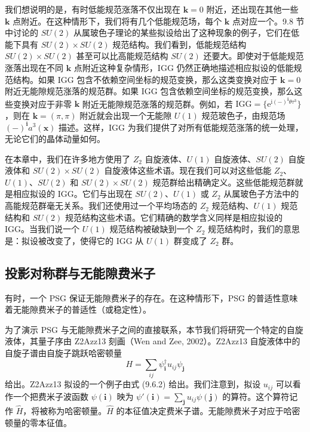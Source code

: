 我们想说明的是，有时低能规范涨落不仅出现在 $\pmb{k}=0$ 附近，还出现在其他一些 $\pmb{k}$ 点附近。在这种情形下，我们将有几个低能规范场，每个 $\pmb{k}$ 点对应一个。9.8 节中讨论的 $SU(2)$ 从属玻色子理论的某些拟设给出了这种现象的例子，它们在低能下具有 $SU(2)\times SU(2)$ 规范结构。我们看到，低能规范结构 $SU(2)\times SU(2)$ 甚至可以比高能规范结构 $SU(2)$ 还要大。即使对于低能规范涨落出现在不同 $\pmb{k}$ 点附近这种复杂情形，IGG 仍然正确地描述相应拟设的低能规范结构。如果 IGG 包含不依赖空间坐标的规范变换，那么这类变换对应于 $\pmb{k}=0$ 附近无能隙规范涨落的规范群。如果 IGG 包含依赖空间坐标的规范变换，那么这些变换对应于非零 $\pmb{k}$ 附近无能隙规范涨落的规范群。例如，若 $\mathrm{IGG}=\{\mathrm{e}^{\mathrm{i}(-)^{\pmb{i}}\theta\tau^{3}}\}$，则在 $\pmb{k}=(\pi,\pi)$ 附近就会出现一个无能隙 $U(1)$ 规范玻色子，由规范场 $(-)^{\pmb{i}}a^{3}(\pmb{x})$ 描述。这样，IGG 为我们提供了对所有低能规范涨落的统一处理，无论它们的晶体动量如何。

在本章中，我们在许多地方使用了 $Z_2$ 自旋液体、$U(1)$ 自旋液体、$SU(2)$ 自旋液体和 $SU(2)\times SU(2)$ 自旋液体这些术语。现在我们可以对这些低能 $Z_2$、$U(1)$、$SU(2)$ 和 $SU(2)\times SU(2)$ 规范群给出精确定义。这些低能规范群就是相应拟设的 IGG。它们与出现在 $SU(2)$、$U(1)$ 或 $Z_2$ 从属玻色子方法中的高能规范群毫无关系。我们还使用过一个平均场态的 $Z_2$ 规范结构、$U(1)$ 规范结构和 $SU(2)$ 规范结构这些术语。它们精确的数学含义同样是相应拟设的 IGG。当我们说一个 $U(1)$ 规范结构被破缺到一个 $Z_2$ 规范结构时，我们的意思是：拟设被改变了，使得它的 IGG 从 $U(1)$ 群变成了 $Z_2$ 群。

\subsection{投影对称群与无能隙费米子}

\begin{keypoints}
\item 有时，一个 PSG 保证无能隙费米子的存在。在这种情形下，PSG 的普适性意味着无能隙费米子的普适性（或稳定性）。
\end{keypoints}

为了演示 PSG 与无能隙费米子之间的直接联系，本节我们将研究一个特定的自旋液体，其量子序由 Z2Azz13 刻画（Wen and Zee, 2002）。Z2Azz13 自旋液体中的自旋子谱由自旋子跳跃哈密顿量
\begin{equation*}
H=\sum_{ij}\psi_{\pmb{i}}^{\dagger}u_{ij}\psi_{\pmb{j}}
\end{equation*}
给出。Z2Azz13 拟设的一个例子由式 (9.6.2) 给出。我们注意到，拟设 $u_{ij}$ 可以看作一个把费米子波函数 $\psi(\pmb{i})$ 映为 $\psi'(\pmb{i})=\sum_{\pmb{j}}u_{ij}\psi(\pmb{j})$ 的算符。这个算符记作 $\hat{H}$，将被称为哈密顿量。$\hat{H}$ 的本征值决定费米子谱。无能隙费米子对应于哈密顿量的零本征值。

